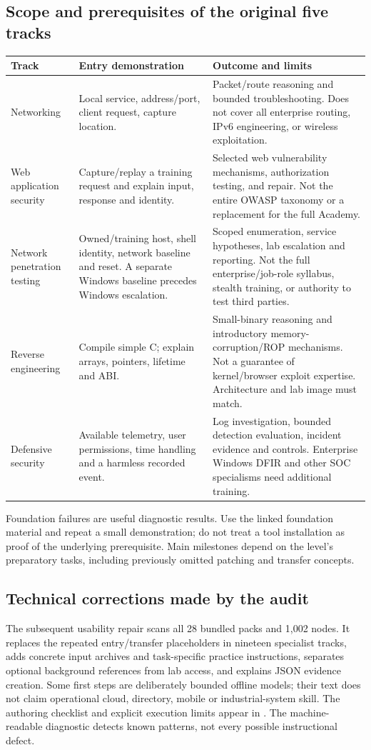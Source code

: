 \subsection{Scope and prerequisites of the original five tracks}
\begin{longtable}{p{}p{}p{}}
\textbf{Track} & \textbf{Entry demonstration} & \textbf{Outcome and limits}\\\hline
Networking & Local service, address/port, client request, capture location. & Packet/route reasoning and bounded troubleshooting. Does not cover all enterprise routing, IPv6 engineering, or wireless exploitation.\\
Web application security & Capture/replay a training request and explain input, response and identity. & Selected web vulnerability mechanisms, authorization testing, and repair. Not the entire OWASP taxonomy or a replacement for the full Academy.\\
Network penetration testing & Owned/training host, shell identity, network baseline and reset. A separate Windows baseline precedes Windows escalation. & Scoped enumeration, service hypotheses, lab escalation and reporting. Not the full enterprise/job-role syllabus, stealth training, or authority to test third parties.\\
Reverse engineering & Compile simple C; explain arrays, pointers, lifetime and ABI. & Small-binary reasoning and introductory memory-corruption/ROP mechanisms. Not a guarantee of kernel/browser exploit expertise. Architecture and lab image must match.\\
Defensive security & Available telemetry, user permissions, time handling and a harmless recorded event. & Log investigation, bounded detection evaluation, incident evidence and controls. Enterprise Windows DFIR and other SOC specialisms need additional training.\\
\end{longtable}
Foundation failures are useful diagnostic results. Use the linked foundation
material and repeat a small demonstration; do not treat a tool installation as
proof of the underlying prerequisite. Main milestones depend on the level's
preparatory tasks, including previously omitted patching and transfer concepts.

\subsection{Technical corrections made by the audit}
The subsequent usability repair scans all 28 bundled packs and 1,002 nodes. It
replaces the repeated entry/transfer placeholders in nineteen specialist tracks,
adds concrete input archives and task-specific practice instructions, separates
optional background references from lab access, and explains JSON evidence
creation. Some first steps are deliberately bounded offline models; their text
does not claim operational cloud, directory, mobile or industrial-system skill.
The authoring checklist and explicit execution limits appear in
. The machine-readable diagnostic
detects known patterns, not every possible instructional defect.

